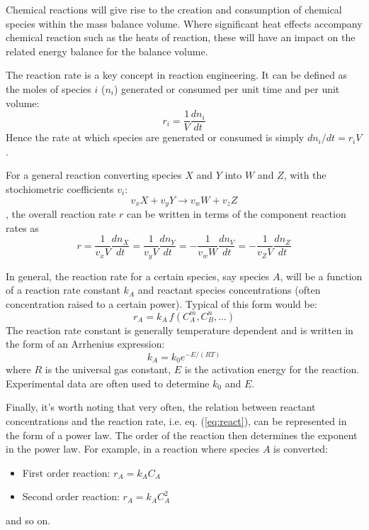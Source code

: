 \documentclass[a4paper,11pt]{article}
\theoremstyle{definition}
\begin{document}
Chemical reactions will give rise to the creation and consumption of chemical species
within the mass balance volume. Where significant heat effects accompany chemical
reaction such as the heats of reaction, these will have an impact on the related energy
balance for the balance volume.

The reaction rate is a key concept in reaction engineering. It can be defined as
the moles of species $i$ ($n_i$) generated or consumed per unit time and per unit
volume:
\begin{equation}
	r_i = \frac{1}{V} \frac{d n_i}{d t}
\end{equation}
\noindent Hence the rate at which species are generated or consumed is simply $d n_i / d t = r_i V$.

For a general reaction converting species $X$ and $Y$ into $W$ and $Z$, with the stochiometric coefficients $v_i$:
\begin{equation}
	v_x X + v_y Y \to v_w W + v_z Z
\end{equation}
\noindent, the overall reaction rate $r$ can be written in terms of the component reaction rates as
\begin{equation}
	r = \frac{1}{v_x V} \frac{d n_X}{d t} = \frac{1}{v_y V} \frac{d n_Y}{d t} 
		= - \frac{1}{v_w W} \frac{d n_V}{d t} = - \frac{1}{v_Z V} \frac{d n_Z}{d t}
\end{equation}

In general, the reaction rate for a certain species, say species $A$, will be a function of a reaction rate
constant $k_A$ and reactant species concentrations (often concentration raised to a certain power). Typical of this form would be:
\begin{equation} \label{eq:react}
	r_A = k_A \, f(C_A^m, C_B^n, \ldots)
\end{equation}
\noindent The reaction rate constant is generally temperature dependent and is written in
the form of an Arrhenius expression:
\begin{equation}
	k_A = k_0 e^{-E/(RT)}
\end{equation}
\noindent where $R$ is the universal gas constant, $E$ is the activation energy for the reaction.
Experimental data are often used to determine $k_0$ and $E$.

Finally, it's worth noting that very often, the relation between reactant concentrations and the reaction rate, i.e. eq. (\ref{eq:react}),
can be represented in the form of a power law. The order of the reaction then determines the exponent in the power law.
For example, in a reaction where species $A$ is converted:
\begin{itemize}
	\item First order reaction: $r_A = k_A C_A$
	\item Second order reaction: $r_A = k_A C_A^2$
\end{itemize}
\noindent and so on.
\end{document}
